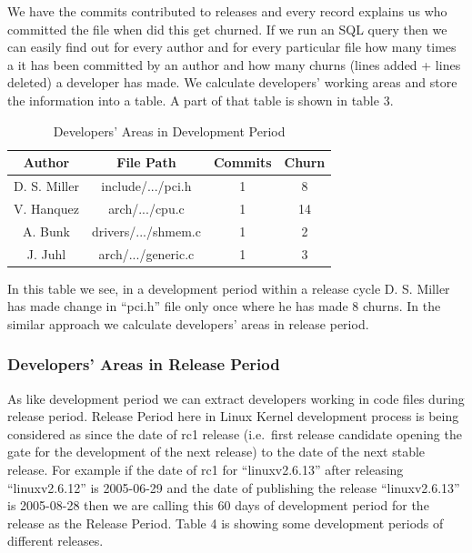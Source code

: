 \documentclass{acm_proc_article-sp}
\begin{document}
We have the commits contributed to releases and every record explains us who committed the file when did this get churned. If we run an SQL query then we can easily find out for every author and for every particular file how many times a it has been committed by an author and how many churns (lines added + lines deleted) a developer has made. We calculate developers' working areas and store the information into a table. A part of that table is shown in table 3.

\begin{table}[ht]
\caption{Developers' Areas in Development Period}  %
\centering 						%
\begin{tabular}{c c c c}				%
\hline\hline						%
Author		& File Path			& Commits		& Churn \\ [0.5ex]
\hline 							%
D. S. Miller	& include/.../pci.h		& 1				& 8 \\
V. Hanquez	& arch/.../cpu.c		& 1				& 14 \\
A. Bunk		& drivers/.../shmem.c	& 1				& 2 \\
J. Juhl		& arch/.../generic.c		& 1				& 3 \\
[1ex]							%
\hline 							%
\end{tabular}
\label{table:nonlin} 				%
\end{table}

In this table we see, in a development period within a release cycle D. S. Miller has made change in ``pci.h'' file only once where he has made 8 churns. In the similar approach we calculate developers' areas in release period.

\subsubsection{Developers' Areas in Release Period}
As like development period we can extract developers working in code files during release period. Release Period here in Linux Kernel development process is being considered as since the date of rc1 release (i.e.\ first release candidate opening the gate for the development of the next release) to the date of the next stable release. For example if the date of rc1 for ``linuxv2.6.13'' after releasing ``linuxv2.6.12'' is 2005-06-29 and the date of publishing the release ``linuxv2.6.13'' is 2005-08-28 then we are calling this 60 days of development period for the release as the Release Period. Table 4 is showing some development periods of different releases.
\end{document}
